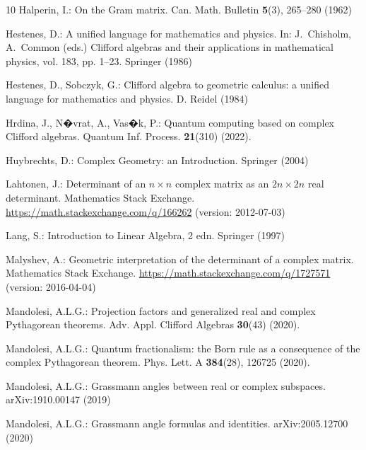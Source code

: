 \documentclass{birkjour}
\theoremstyle{definition}
\begin{document}
\begin{thebibliography}{10}
	Halperin, I.: On the {G}ram matrix.
	\newblock Can. Math. Bulletin \textbf{5}(3), 265--280 (1962)
	
	Hestenes, D.: A unified language for mathematics and physics.
	\newblock In: J.~Chisholm, A.~Common (eds.) Clifford algebras and their
	applications in mathematical physics, vol. 183, pp. 1--23. Springer (1986)
	
	Hestenes, D., Sobczyk, G.: Clifford algebra to geometric calculus: a unified
	language for mathematics and physics.
	\newblock D. Reidel (1984)
	
	Hrdina, J., N�vrat, A., Vas�k, P.: Quantum computing based on complex Clifford algebras.
	\newblock Quantum Inf. Process. \textbf{21}(310) (2022).
	\newblock {}
	
	Huybrechts, D.: Complex Geometry: an Introduction.
	\newblock Springer (2004)
	
	Lahtonen, J.: Determinant of an $n\times n$ complex matrix as an $2n\times 2n$
	real determinant.
	\newblock Mathematics Stack Exchange.
	\urlprefix \url{https://math.stackexchange.com/q/166262} (version: 2012-07-03)
	
	Lang, S.: Introduction to Linear Algebra, 2 edn.
	\newblock Springer (1997)
	
	Malyshev, A.: Geometric interpretation of the determinant of a complex matrix.
	\newblock Mathematics Stack Exchange.
	\urlprefix \url{https://math.stackexchange.com/q/1727571} (version: 2016-04-04)
	
	Mandolesi, A.L.G.: Projection factors and generalized real and complex
	{P}y\-thag\-o\-re\-an theorems.
	\newblock Adv. Appl. Clifford Algebras \textbf{30}(43) (2020).
	\newblock {}
	
	Mandolesi, A.L.G.: Quantum fractionalism: the {B}orn rule as a consequence of
	the complex {P}ythagorean theorem.
	\newblock Phys. Lett. A \textbf{384}(28), 126725 (2020).
	\newblock {}
	
	Mandolesi, A.L.G.: Grassmann angles between real or complex subspaces.
	\newblock arXiv:1910.00147 (2019)
	
	Mandolesi, A.L.G.: Grassmann angle formulas and identities.
	\newblock arXiv:2005.12700 (2020)
	

\end{thebibliography}
\end{document}
